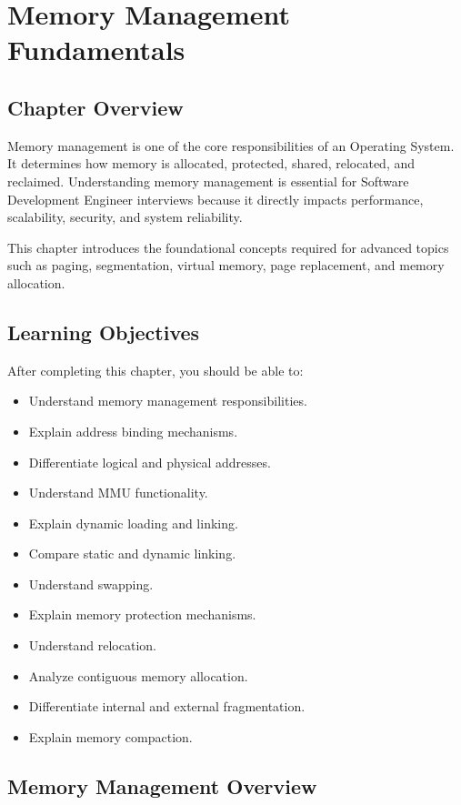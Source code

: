 \chapter{Memory Management Fundamentals}

\section{Chapter Overview}

Memory management is one of the core responsibilities of an Operating System. It determines how memory is allocated, protected, shared, relocated, and reclaimed. Understanding memory management is essential for Software Development Engineer interviews because it directly impacts performance, scalability, security, and system reliability.

This chapter introduces the foundational concepts required for advanced topics such as paging, segmentation, virtual memory, page replacement, and memory allocation.

\section{Learning Objectives}

After completing this chapter, you should be able to:

\begin{itemize}
\item Understand memory management responsibilities.
\item Explain address binding mechanisms.
\item Differentiate logical and physical addresses.
\item Understand MMU functionality.
\item Explain dynamic loading and linking.
\item Compare static and dynamic linking.
\item Understand swapping.
\item Explain memory protection mechanisms.
\item Understand relocation.
\item Analyze contiguous memory allocation.
\item Differentiate internal and external fragmentation.
\item Explain memory compaction.
\end{itemize}

\section{Memory Management Overview}

